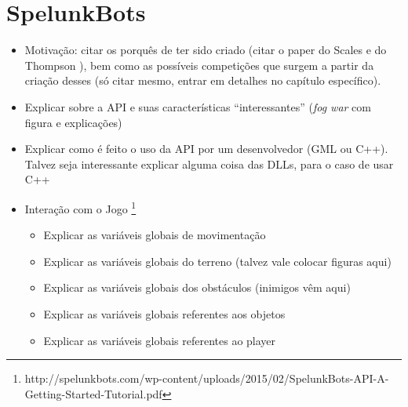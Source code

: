 \chapter{\label{chap:spelunkbots}SpelunkBots}

\begin{itemize}
    \item Motivação: citar os porquês de ter sido criado (citar o paper do
        Scales e do Thompson \cite{SPELUNKBOTSPAPER}), bem como as possíveis
        competições que surgem a partir da criação desses (só citar mesmo,
        entrar em detalhes no capítulo específico).
    \item Explicar sobre a API e suas características ``interessantes''
        (\textit{fog war} com figura e explicações)
    \item Explicar como é feito o uso da API por um desenvolvedor (GML ou
        C++). Talvez seja interessante explicar alguma coisa das DLLs,
        para o caso de usar C++
    \item Interação com o Jogo
        \footnote{http://spelunkbots.com/wp-content/uploads/2015/02/SpelunkBots-API-A-Getting-Started-Tutorial.pdf}
    \begin{itemize}
        \item Explicar as variáveis globais de movimentação
        \item Explicar as variáveis globais do terreno (talvez vale
            colocar figuras aqui)
        \item Explicar as variáveis globais dos obstáculos (inimigos vêm aqui)
        \item Explicar as variáveis globais referentes aos objetos
        \item Explicar as variáveis globais referentes ao player
    \end{itemize}
\end{itemize}
